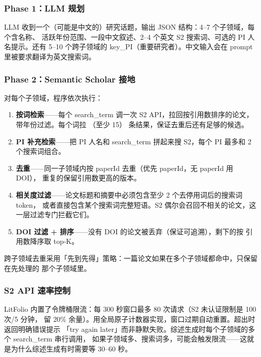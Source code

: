 \subsubsection{Phase 1：LLM 规划}

LLM 收到一个（可能是中文的）研究话题，输出 JSON 结构：4--7 个子领域，每个含名称、
活跃年份范围、一段中文叙述、2--4 个英文 S2 搜索词、可选的 PI 人名提示。还有 5--10
个跨子领域的 key\_PI（重要研究者）。中文输入会在 prompt 里被要求翻译为英文搜索词。

\subsubsection{Phase 2：Semantic Scholar 接地}

对每个子领域，程序依次执行：

\begin{enumerate}
  \item \textbf{按词检索}——每个 search\_term 调一次 S2 
    API，拉回按引用数排序的论文，带年份过滤。每个词拉 （至少 15）
    条结果，保证去重后还有足够的候选。
  \item \textbf{PI 补充检索}——把 PI 人名和 search\_term 拼起来搜 S2，每个 PI
    最多和 2 个搜索词组合。
  \item \textbf{去重}——同一子领域内按 paperId 去重（优先 paperId，无 paperId 用 DOI），
    重复的保留引用数更高的版本。
  \item \textbf{相关度过滤}——论文标题和摘要中必须包含至少 2 个去停用词后的搜索词 token，
    或者直接包含某个搜索词完整短语。S2 偶尔会召回不相关的论文，这一层过滤专门拦截它们。
  \item \textbf{DOI 过滤 + 排序}——没有 DOI 的论文被丢弃（保证可追溯），剩下的按
    引用数降序取 top-K。
\end{enumerate}

跨子领域去重采用「先到先得」策略：一篇论文如果在多个子领域都命中，只保留在先处理的
那个子领域里。

\subsubsection{S2 API 速率控制}

LitFolio 内置了令牌桶限流：每 300 秒窗口最多 80 次请求（S2 未认证限制是 100 次/5 分钟，
留 20\% 余量）。用全局原子计数器实现，窗口过期自动重置。超出时返回明确错误提示
「try again later」而非静默失败。综述生成时每个子领域的多个 search\_term 串行调用，
如果子领域多、搜索词多，可能会触发限流——这就是为什么综述生成有时需要等 30--60 秒。

